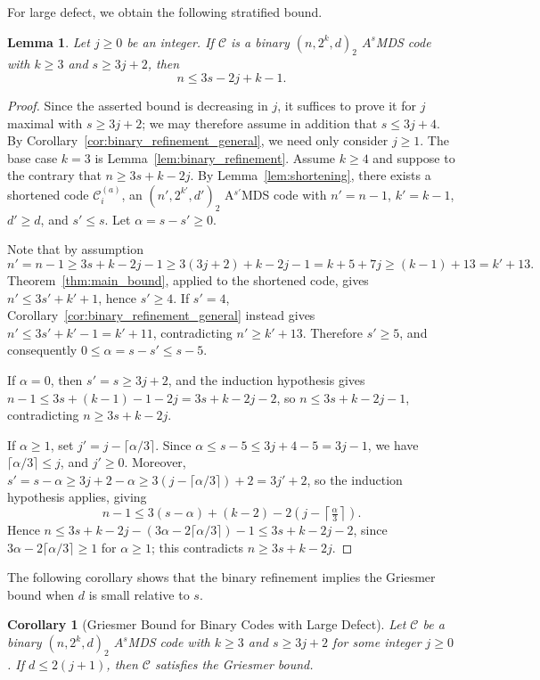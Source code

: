 \documentclass[12pt, letterpaper]{article}
\theoremstyle{plain}
\newtheorem{lemma}[theorem]{Lemma}
\newtheorem{corollary}[theorem]{Corollary}
\theoremstyle{definition}
\newcommand{\mc}[1]{\mathcal{#1}}
\begin{document}
	For large defect, we obtain the following stratified bound.	
	\begin{lemma}\label{lem:binary_refinement_k}
		Let $j \ge 0$ be an integer. If \(\mathcal{C}\) is a binary \((n, 2^k, d)_2\) $A^s$MDS code with $k\ge 3$ and \(s \ge 3j+2\), then
		\[
		n \le 3s - 2j+k-1.
		\]
	\end{lemma}
	\begin{proof}
		Since the asserted bound is decreasing in $j$, it suffices to prove it for $j$ maximal with $s \ge 3j+2$; we may therefore assume in addition that $s \le 3j+4$. By Corollary~\ref{cor:binary_refinement_general}, we need only consider $j\ge 1$. The base case $k=3$ is Lemma~\ref{lem:binary_refinement}. Assume $k \ge 4$ and suppose to the contrary that $n \ge 3s+k-2j$. By Lemma~\ref{lem:shortening}, there exists a shortened code $\mc{C}_i^{(a)}$, an $(n',2^{k'},d')_2$ A$^{s'}$MDS code with $n'=n-1$, $k'=k-1$, $d'\ge d$, and $s'\le s$. Let $\alpha = s - s' \ge 0$.

	Note that by assumption
	 \[n'=n-1\ge 3s+k-2j-1\ge 3(3j+2)+k-2j-1=k+5+7j\ge (k-1)+13=k'+13. \]
	 Theorem~\ref{thm:main_bound}, applied to the shortened code, gives $n'\le3s'+k'+1$, hence $s'\ge4$. If $s'=4$, Corollary~\ref{cor:binary_refinement_general} instead gives $n'\le3s'+k'-1=k'+11$, contradicting $n'\ge k'+13$. Therefore $s'\ge5$, and consequently $0\le\alpha=s-s'\le s-5$.

		If $\alpha = 0$, then $s' = s \ge 3j+2$, and the induction hypothesis 	gives $n-1 \le 3s+(k-1)-1-2j = 3s+k-2j-2$, so $n \le 3s+k-2j-1$, contradicting $n \ge 3s+k-2j$.

		If $\alpha \ge 1$, set $j' = j - \lceil\alpha/3\rceil$. Since $\alpha \le s-5 \le 3j+4-5 = 3j-1$, we have $\lceil\alpha/3\rceil \le j$, and $j' \ge 0$. Moreover,
		$s' = s-\alpha \ge 3j+2-\alpha \ge 3(j-\lceil\alpha/3\rceil)+2 = 3j'+2$, so the induction hypothesis applies, giving
		\[
		n-1 \le 3(s-\alpha)+(k-2)-2\!\left(j-
		\left\lceil\tfrac{\alpha}{3}\right\rceil\right).
		\]
		Hence $n \le 3s+k-2j-(3\alpha-2\lceil\alpha/3\rceil)-1 \le 3s+k-2j-2$, since $3\alpha-2\lceil\alpha/3\rceil \ge 1$ for $\alpha \ge 1$; this contradicts $n \ge 3s+k-2j$.
	\end{proof}
	
	The following corollary shows that the binary refinement implies the Griesmer bound when $d$ is small relative to $s$.
	
	\begin{corollary}[Griesmer Bound for Binary Codes with Large Defect]
		\label{cor:binary_griesmer_large_s}
		Let $\mathcal{C}$ be a binary $(n, 2^k, d)_2$ $A^s$MDS code with $k \ge 3$ and $s \ge 3j+2$ for some integer $j \ge 0$. If 	$d \le 2(j+1)$, then $\mathcal{C}$ satisfies the Griesmer bound.
	\end{corollary}
	
\end{document}
